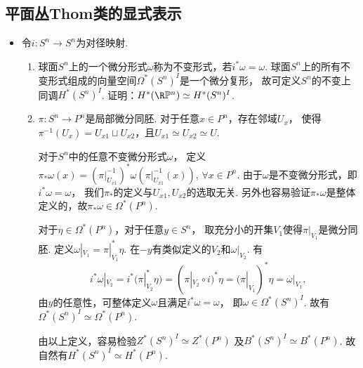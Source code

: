 \subsection{平面丛Thom类的显式表示}
\begin{itemize}
    \item[10.4] 令$i:S^{n} \to S^{n}$为对径映射.
    \begin{enumerate}
        \item[(a)] 球面$S^{n}$上的一个微分形式$\omega$称为不变形式，若$i^{*}\omega = \omega$.
                   球面$S^{n}$上的所有不变形式组成的向量空间$\Omega^{*}(S^{n})^{I}$是一个微分复形，
                   故可定义$S^{n}$的不变上同调$H^{*}(S^{n})^{I}$. 
                   证明：$H^{*}(\R\mathbb{P}^{n}) \simeq H^{*}(S^{n})^{I}$.
        \item[\textbf{证明：}]
        \qquad $\pi: S^n\rightarrow P^n$是局部微分同胚. 
        对于任意$x\in P^n$，存在邻域$U_x$，
        使得$\pi^{-1}(U_x)=U_{x1}\sqcup U_{x2}$，且$U_{x1}\simeq U_{x2}\simeq U$.

        \qquad 对于$S^n$中的任意不变微分形式$\omega$，
        定义$\pi_*\omega(x)=(\pi|_{U_{x1}}^{-1})^*\omega(\pi|_{U_{x1}}^{-1}(x))$, 
        $\forall x\in P^n$. 由于$\omega$是不变微分形式，即$i^*\omega=\omega$，
        我们$\pi_*$的定义与$U_{x1}, U_{x2}$的选取无关. 
        另外也容易验证$\pi_*\omega$是整体定义的，故$\pi_*\omega\in \Omega^*(P^n)$.

        \qquad 对于$\eta\in \Omega^*(P^n)$，对于任意$y\in S^n$，
        取充分小的开集$V_1$使得$\pi|_{V_1}$是微分同胚. 
        定义$\omega|_{V_1}=\pi|_{V_1}^*\eta$. 
        在$-y$有类似定义的$V_2$和$\omega|_{V_2}$. 有                
        $$i^*\omega|_{V_2}=i^*(\pi|_{V_2}^*\eta)
        =(\pi|_{V_2}\circ i)^*\eta=(\pi|_{V_1})^*\eta=\omega|_{V_1},$$
        由$y$的任意性，可整体定义$\omega$且满足$i^*\omega=\omega$，
        即$\omega\in \Omega^*(S^n)^I$. 故有$\Omega^*(S^n)^I\simeq \Omega^*(P^n)$.

        \qquad 由以上定义，容易检验$Z^*(S^n)^I\simeq Z^*(P^n)$
        及$B^*(S^n)^I\simeq B^*(P^n)$. 故自然有$H^*(S^n)^I\simeq H^*(P^n)$.



\end{enumerate}
\end{itemize}
